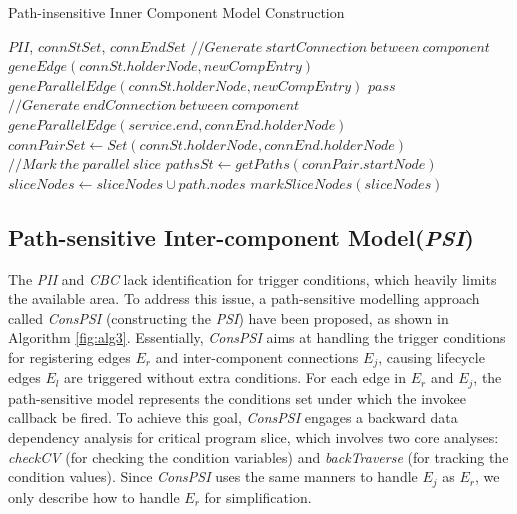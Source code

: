\begin{algorithm}
\caption{Path-insensitive Inner Component Model Construction}
\footnotesize
\begin{algorithmic}[1]
 {$PII$, $connStSet$, $connEndSet$}
\State $//Generate\ startConnection\ between\ component$
\State $        geneEdge(connSt.holderNode, newCompEntry)$
\State $        geneParallelEdge(connSt.holderNode, newCompEntry)$
\Else $pass$
\EndIf
\EndFor
\State $ //Generate\ endConnection\ between\ component $
\State $  geneParallelEdge(service.end, connEnd.holderNode )$
\EndFor    
\State $ connPairSet\leftarrow Set(connSt.holderNode,connEnd.holderNode)$
\State $       //Mark\ the\ parallel\ slice$
\State $  pathsSt \leftarrow getPaths(connPair.startNode)$
\State $   sliceNodes \leftarrow sliceNodes \cup path.nodes$
\EndIf
\EndFor
\EndFor
\State $       markSliceNodes(sliceNodes )$
\EndProcedure
\end{algorithmic}
\label{fig:alg2}
\end{algorithm}

\subsection{Path-sensitive Inter-component Model(\textit{PSI})} 
The \textit{PII} and \textit{CBC} lack identification for trigger conditions, which heavily limits the available area. To address this issue, a path-sensitive modelling approach called \textit{ConsPSI} (constructing the \textit{PSI}) have been proposed, as shown in Algorithm \ref{fig:alg3}. Essentially, \textit{ConsPSI} aims at handling the trigger conditions for registering edges $E_{r}$ and inter-component connections $E_{j}$, causing lifecycle edges $E_{l}$ are triggered without extra conditions. For each edge in $E_{r}$ and $E_{j}$, the path-sensitive model represents the conditions set under which the invokee callback be fired. To achieve this goal, \textit{ConsPSI} engages a backward data dependency analysis for critical program slice, which involves two core analyses: \textit{checkCV} (for checking the condition variables) and \textit{backTraverse} (for tracking the condition values). Since \textit{ConsPSI} uses the same manners to handle $E_{j}$ as  $E_{r}$, we only describe how to handle $E_{r}$ for simplification.

